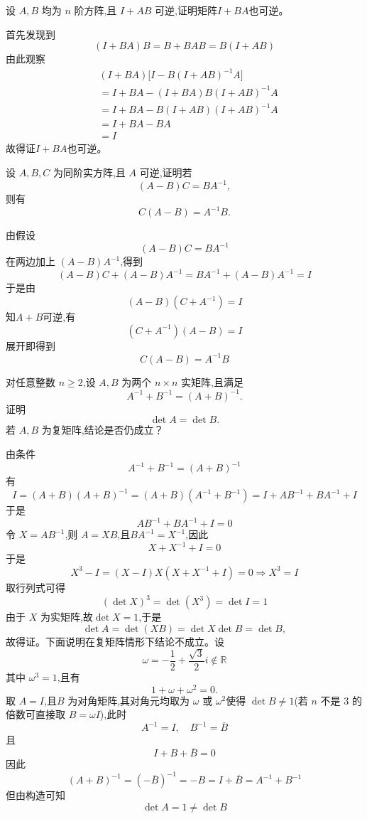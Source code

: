\begin{questions}
    \question 设 $A,B$ 均为 $n$ 阶方阵,且 $I+AB$ 可逆,证明矩阵$I+BA$也可逆。
    \begin{solution}
        首先发现到
        \[
        (I+BA)B=B + BAB=B(I + AB)
        \]
        由此观察
        \begin{align*}
        &(I+BA)\bigl[I - B(I+AB)^{-1}A\bigr] \\
        &= I + BA - (I+BA)B(I+AB)^{-1}A \\
        &= I + BA - B(I + AB)(I+AB)^{-1}A \\
        &= I + BA - BA \\
        &= I
        \end{align*}
        故得证$I+BA$也可逆。
    \end{solution}

    \question 设 $A,B,C$ 为同阶实方阵,且 $A$ 可逆,证明若
    \[
    (A-B)C = BA^{-1},
    \]
    则有
    \[
    C(A-B) = A^{-1}B.
    \]
    \begin{solution}
        由假设
        \[
        (A-B)C = BA^{-1}
        \]
        在两边加上 $(A-B)A^{-1}$,得到
        \[
        (A-B)C + (A-B)A^{-1} = BA^{-1} + (A-B)A^{-1} = I
        \]
        于是由
        \[
        (A-B)(C + A^{-1}) = I 
        \]
        知$A+B$可逆,有
        \[
        (C + A^{-1})(A-B) = I
        \]
        展开即得到
        \[
        C(A-B) = A^{-1}B
        \]
    \end{solution}

    \question 对任意整数 $n\ge 2$,设 $A,B$ 为两个 $n\times n$ 实矩阵,且满足
    \[
    A^{-1}+B^{-1}=(A+B)^{-1}.
    \]
    证明 
    \[
    \det A=\det B.
    \]
    若 $A,B$ 为复矩阵,结论是否仍成立？
    \begin{solution}
        由条件
        \[
        A^{-1}+B^{-1}=(A+B)^{-1}
        \]
        有
        \[
        I=(A+B)(A+B)^{-1} =(A+B)(A^{-1}+B^{-1}) =I+AB^{-1}+BA^{-1}+I
        \]
        于是
        \[
        AB^{-1}+BA^{-1}+I=0
        \]
        令 $X=AB^{-1}$,则 $A=XB$,且$BA^{-1}=X^{-1}$,因此
        \[
        X+X^{-1}+I=0 
        \]
        于是
        \[
        X^3-I=(X-I)X(X+X^{-1}+I)=0 \Rightarrow X^3=I
        \]
        取行列式可得
        \[
        (\det X)^3=\det(X^3)=\det I=1
        \]
        由于 $X$ 为实矩阵,故$\det X=1$,于是
        \[
        \det A=\det(XB)=\det X\det B=\det B,
        \]
        故得证。下面说明在复矩阵情形下结论不成立。设
        \[
        \omega=-\frac{1}{2}+\frac{\sqrt{3}}{2}i \notin\mathbb{R}
        \]
        其中 $\omega^3=1$,且有
        \[
        1+\omega+\omega^2=0.
        \]
        取 $A=I$,且$B$ 为对角矩阵,其对角元均取为 $\omega$ 或 $\omega^2$使得 $\det B\neq1$(若 $n$ 不是 $3$ 的倍数可直接取 $B=\omega I$),此时
        \[
        A^{-1}=I,\quad B^{-1}=\overline{B}
        \]
        且
        \[
        I+B+\overline{B}=0
        \]
        因此
        \[
        (A+B)^{-1}=(-\overline{B})^{-1}=-B=I+\overline{B}
        =A^{-1}+B^{-1}
        \]
        但由构造可知
        \[
        \det A=1\ne\det B
        \]
    \end{solution}


\end{questions}
